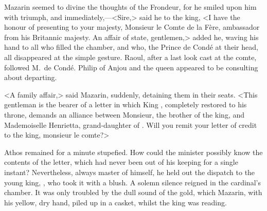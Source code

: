 Mazarin seemed to divine the thoughts of the Frondeur, for he smiled upon him with triumph, and immediately,—<Sire,> said he to the king, <I have the honour of presenting to your majesty, Monsieur le Comte de la Fère, ambassador from his Britannic majesty. An affair of state, gentlemen,> added he, waving his hand to all who filled the chamber, and who, the Prince de Condé at their head, all disappeared at the simple gesture. Raoul, after a last look cast at the comte, followed M.~de Condé. Philip of Anjou and the queen appeared to be consulting about departing.

<A family affair,> said Mazarin, suddenly, detaining them in their seats. <This gentleman is the bearer of a letter in which King , completely restored to his throne, demands an alliance between Monsieur, the brother of the king, and Mademoiselle Henrietta, grand-daughter of . Will you remit your letter of credit to the king, monsieur le comte?>

Athos remained for a minute stupefied. How could the minister possibly know the contents of the letter, which had never been out of his keeping for a single instant? Nevertheless, always master of himself, he held out the dispatch to the young king, , who took it with a blush. A solemn silence reigned in the cardinal's chamber. It was only troubled by the dull sound of the gold, which Mazarin, with his yellow, dry hand, piled up in a casket, whilst the king was reading. 